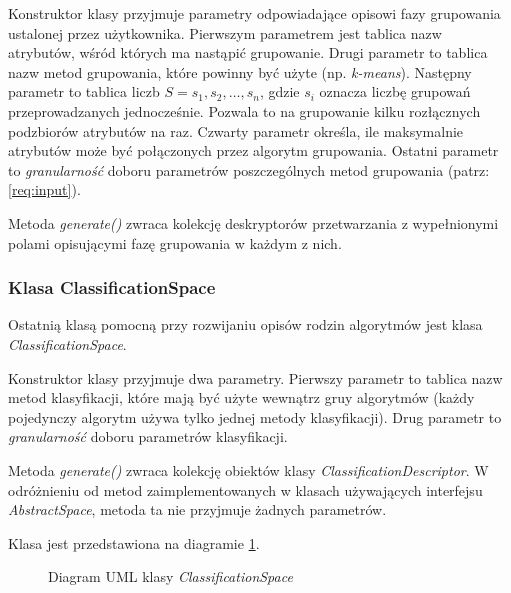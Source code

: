 \documentclass[../thesis.tex]{subfiles}
\begin{document}
Konstruktor klasy przyjmuje parametry odpowiadające opisowi fazy grupowania ustalonej przez użytkownika. Pierwszym parametrem jest tablica nazw atrybutów, wśród których ma nastąpić grupowanie. Drugi parametr to tablica nazw metod grupowania, które powinny być użyte (np. \emph{k-means}). Następny parametr to tablica liczb $S = s_1, s_2, \ldots, s_n$, gdzie $s_i$ oznacza liczbę grupowań przeprowadzanych jednocześnie. Pozwala to na grupowanie kilku rozłącznych podzbiorów atrybutów na raz. Czwarty parametr określa, ile maksymalnie atrybutów może być połączonych przez algorytm grupowania. Ostatni parametr to \emph{granularność} doboru parametrów poszczególnych metod grupowania (patrz: \ref{req:input}).

Metoda \emph{generate()} zwraca kolekcję deskryptorów przetwarzania z wypełnionymi polami opisującymi fazę grupowania w każdym z nich.

\subsubsection{Klasa ClassificationSpace}

Ostatnią klasą pomocną przy rozwijaniu opisów rodzin algorytmów jest klasa \emph{ClassificationSpace}.

Konstruktor klasy przyjmuje dwa parametry. Pierwszy parametr to tablica nazw metod klasyfikacji, które mają być użyte wewnątrz gruy algorytmów (każdy pojedynczy algorytm używa tylko jednej metody klasyfikacji). Drug parametr to \emph{granularność} doboru parametrów klasyfikacji.

Metoda \emph{generate()} zwraca kolekcję obiektów klasy \emph{ClassificationDescriptor}. W odróżnieniu od metod zaimplementowanych w klasach używających interfejsu \emph{AbstractSpace}, metoda ta nie przyjmuje żadnych parametrów.

Klasa jest przedstawiona na diagramie \ref{proj:diagram_classification_space}.

\begin{figure}[h]
\centering
{}
\caption{Diagram UML klasy \emph{ClassificationSpace}}
\label{proj:diagram_classification_space}
\end{figure}
\end{document}
